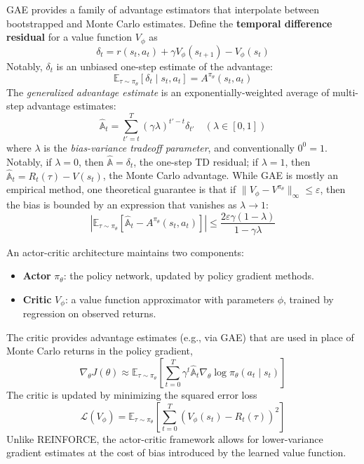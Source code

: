 \documentclass[11pt, letterpaper]{article}
\begin{document}
\begin{concept}
    GAE provides a family of advantage estimators that interpolate between bootstrapped and Monte Carlo estimates. Define the \textbf{temporal difference residual} for a value function \(V_\phi\) as 
    \[
        \delta_t = r(s_t, a_t) + \gamma V_\phi(s_{t+1}) - V_\phi(s_t)
    \]
    Notably, \(\delta_t\) is an unbiased one-step estimate of the advantage: 
    \[
        \mathbb{E}_{\tau \sim \pi_\theta}\left[\delta_t \mid s_t, a_t\right] = A^{\pi_\theta}(s_t, a_t)
    \]
    The \textit{generalized advantage estimate} is an exponentially-weighted average of multi-step advantage estimates: 
    \[
        \widehat{\mathbb{A}}_t = \sum_{t'=t}^{T} (\gamma\lambda)^{t'-t} \delta_{t'} \quad (\lambda \in [0,1])
    \]
    where \(\lambda\) is the \textit{bias-variance tradeoff parameter}, and conventionally \(0^0 = 1\). Notably, if \(\lambda=0\), then \(\widehat{\mathbb{A}} = \delta_t\), the one-step TD residual; if \(\lambda = 1\), then \(\widehat{\mathbb{A}}_t = R_t(\tau) - V(s_t)\), the Monte Carlo advantage. While GAE is mostly an empirical method, one theoretical guarantee is that if \(\|V_\phi - V^{\pi_\theta}\|_\infty \leq \varepsilon\), then the bias is bounded by an expression that vanishes as \(\lambda \to 1\): 
    \[
        \left| \mathbb{E}_{\tau \sim \pi_\theta}[\widehat{\mathbb{A}}_t - A^{\pi_\theta}(s_t, a_t)] \right| \leq \frac{2\varepsilon\gamma(1 - \lambda)}{1 - \gamma\lambda}
    \]
\end{concept}

\begin{concept}
    An actor-critic architecture maintains two components: 
    \begin{itemize}
        \item \textbf{Actor} \(\pi_\theta\): the policy network, updated by policy gradient methods. 
        \item \textbf{Critic} \(V_\phi\): a value function approximator with parameters \(\phi\), trained by regression on observed returns. 
    \end{itemize}
    The critic provides advantage estimates (e.g., via GAE) that are used in place of Monte Carlo returns in the policy gradient, 
    \[
        \nabla_\theta J(\theta) \approx \mathbb{E}_{\tau \sim \pi_\theta} \left[ \sum_{t=0}^T \gamma^t \widehat{\mathbb{A}}_t \nabla_\theta \log \pi_\theta(a_t \mid s_t) \right]
    \]
    The critic is updated by minimizing the squared error loss 
    \[
        \mathcal{L}(V_\phi) = \mathbb{E}_{\tau \sim \pi_\theta}\left[\sum_{t=0}^T (V_\phi(s_t) - R_t(\tau))^2\right]
    \]
    Unlike REINFORCE, the actor-critic framework allows for lower-variance gradient estimates at the cost of bias introduced by the learned value function. 
\end{concept}
\end{document}

